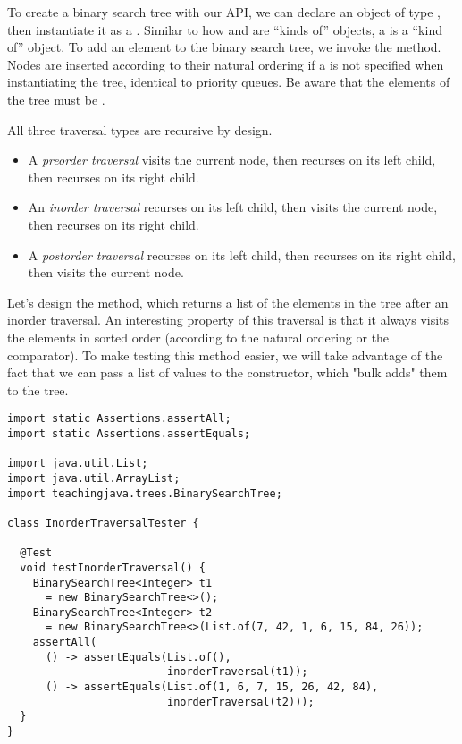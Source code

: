 To create a binary search tree with our API, we can declare an object of type , then instantiate it as a . 
Similar to how  and  are ``kinds of''  objects, a  is a ``kind of''  object.
To add an element to the binary search tree, we invoke the  method. 
Nodes are inserted according to their natural ordering if a  is not specified when instantiating the tree, identical to priority queues. 
Be aware that the elements of the tree must be .

All three traversal types are recursive by design.
\begin{itemize}
  \item A \emph{preorder traversal} visits the current node, then recurses on its left child, then recurses on its right child.
  \item An \emph{inorder traversal} recurses on its left child, then visits the current node, then recurses on its right child.
  \item A \emph{postorder traversal} recurses on its left child, then recurses on its right child, then visits the current node.
\end{itemize}

Let's design the  method, which returns a list of the elements in the tree after an inorder traversal. 
An interesting property of this traversal is that it always visits the elements in sorted order (according to the natural ordering or the comparator). 
To make testing this method easier, we will take advantage of the fact that we can pass a list of values to the  constructor, which "bulk adds" them to the tree.

\begin{lstlisting}[language=MyJava]
import static Assertions.assertAll;
import static Assertions.assertEquals;

import java.util.List;
import java.util.ArrayList;
import teachingjava.trees.BinarySearchTree;

class InorderTraversalTester {

  @Test
  void testInorderTraversal() {
    BinarySearchTree<Integer> t1 
      = new BinarySearchTree<>();
    BinarySearchTree<Integer> t2 
      = new BinarySearchTree<>(List.of(7, 42, 1, 6, 15, 84, 26));
    assertAll(
      () -> assertEquals(List.of(), 
                         inorderTraversal(t1));
      () -> assertEquals(List.of(1, 6, 7, 15, 26, 42, 84), 
                         inorderTraversal(t2)));
  }
}

\end{lstlisting}

